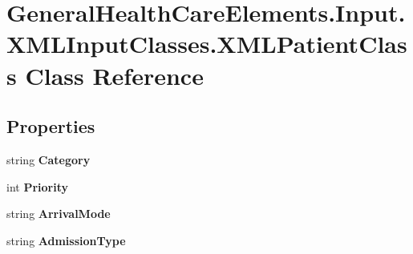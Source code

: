 \hypertarget{class_general_health_care_elements_1_1_input_1_1_x_m_l_input_classes_1_1_x_m_l_patient_class}{}\section{General\+Health\+Care\+Elements.\+Input.\+X\+M\+L\+Input\+Classes.\+X\+M\+L\+Patient\+Class Class Reference}
\label{class_general_health_care_elements_1_1_input_1_1_x_m_l_input_classes_1_1_x_m_l_patient_class}
\subsection*{Properties}
\begin{DoxyCompactItemize}
\item 
string {\bfseries Category}\hypertarget{class_general_health_care_elements_1_1_input_1_1_x_m_l_input_classes_1_1_x_m_l_patient_class_abec71398cd66fca835ba252345622927}{}\label{class_general_health_care_elements_1_1_input_1_1_x_m_l_input_classes_1_1_x_m_l_patient_class_abec71398cd66fca835ba252345622927}

\item 
int {\bfseries Priority}\hypertarget{class_general_health_care_elements_1_1_input_1_1_x_m_l_input_classes_1_1_x_m_l_patient_class_a45db5d562fe9d28bc5a80f5810f752f2}{}\label{class_general_health_care_elements_1_1_input_1_1_x_m_l_input_classes_1_1_x_m_l_patient_class_a45db5d562fe9d28bc5a80f5810f752f2}

\item 
string {\bfseries Arrival\+Mode}\hypertarget{class_general_health_care_elements_1_1_input_1_1_x_m_l_input_classes_1_1_x_m_l_patient_class_a539c2a14c36eb1772083ca007ae89a6e}{}\label{class_general_health_care_elements_1_1_input_1_1_x_m_l_input_classes_1_1_x_m_l_patient_class_a539c2a14c36eb1772083ca007ae89a6e}

\item 
string {\bfseries Admission\+Type}\hypertarget{class_general_health_care_elements_1_1_input_1_1_x_m_l_input_classes_1_1_x_m_l_patient_class_ae840c9b2ffd3d0104145dff215ad8aaa}{}\label{class_general_health_care_elements_1_1_input_1_1_x_m_l_input_classes_1_1_x_m_l_patient_class_ae840c9b2ffd3d0104145dff215ad8aaa}


\end{DoxyCompactItemize}
